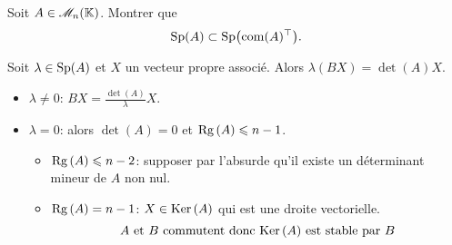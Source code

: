\begin{exercice}
    Soit $A \in \mathscr{M}_n(\mathbb{K})$. Montrer que 
    $$\mathrm{Sp}(A) \subset \mathrm{Sp} \big( \mathrm{com}(A)^\top \big).$$
\end{exercice}
\begin{elem_sol}
    Soit $\lambda \in \mathrm{Sp}(A)$ et $X$ un vecteur propre associé. Alors $\lambda (BX) = \det(A) X$. 
        
    \begin{itemize}
        \item $\lambda \not = 0$: $BX = \frac{\det(A)}{\lambda}X$. 
        \item $\lambda = 0$: alors $\det(A) = 0$ et $\mathrm{Rg}\,(A) \leqslant n-1$. 
        \begin{itemize}
            \item $\mathrm{Rg}\,(A) \leqslant n-2$: supposer par l'absurde qu'il existe un déterminant mineur de $A$ non nul. 
            \item $\mathrm{Rg}\,(A) = n-1$: $X \in \mathrm{Ker}\,(A)$ qui est une droite vectorielle. 
            $$A \text{ et } B \text{ commutent donc } \mathrm{Ker}\,(A) \text{ est stable par } B$$
        \end{itemize}
    \end{itemize}
\end{elem_sol}
